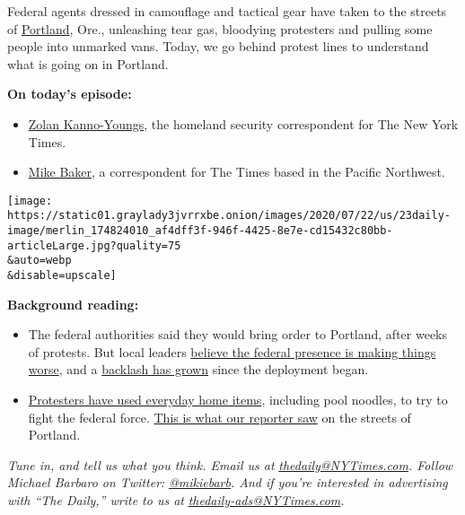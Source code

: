 Federal agents dressed in camouflage and tactical gear have taken to the
streets of
\href{https://www.nytimes3xbfgragh.onion/2020/07/23/upshot/trump-portland.html}{Portland},
Ore., unleashing tear gas, bloodying protesters and pulling some people
into unmarked vans. Today, we go behind protest lines to understand what
is going on in Portland.

\textbf{On today's episode:}

\begin{itemize}
\item
  \href{https://www.nytimes3xbfgragh.onion/by/zolan-kanno-youngs}{Zolan
  Kanno-Youngs}, the homeland security correspondent for The New York
  Times.
\item
  \href{https://www.nytimes3xbfgragh.onion/by/mike-baker?smid=pc-thedaily}{Mike
  Baker}, a correspondent for The Times based in the Pacific Northwest.
\end{itemize}

\texttt{[image: https://static01.graylady3jvrrxbe.onion/images/2020/07/22/us/23daily-image/merlin\_174824010\_af4dff3f-946f-4425-8e7e-cd15432c80bb-articleLarge.jpg?quality=75\\\&auto=webp\\\&disable=upscale]}

\textbf{Background reading:}

\begin{itemize}
\item
  The federal authorities said they would bring order to Portland, after
  weeks of protests. But local leaders
  \href{https://www.nytimes3xbfgragh.onion/2020/07/17/us/portland-protests.html}{believe
  the federal presence is making things worse}, and a
  \href{https://www.nytimes3xbfgragh.onion/2020/07/21/us/portland-protests.html}{backlash
  has grown} since the deployment began.
\item
  \href{https://www.nytimes3xbfgragh.onion/2020/07/22/us/portland-protest-tactics.html}{Protesters
  have used everyday home items}, including pool noodles, to try to
  fight the federal force.
  \href{https://www.nytimes3xbfgragh.onion/interactive/2020/07/21/us/portland-protests.html}{This
  is what our reporter saw} on the streets of Portland.
\end{itemize}

\emph{Tune in, and tell us what you think. Email us at}
\href{mailto:thedaily@NYTimes.com}{\emph{thedaily@NYTimes.com}}\emph{.
Follow Michael Barbaro on Twitter:}
\href{https://twitter.com/mikiebarb}{\emph{@mikiebarb}}\emph{. And if
you're interested in advertising with ``The Daily,'' write to us at}
\href{mailto:thedaily-ads@NYTimes.com}{\emph{thedaily-ads@NYTimes.com}}\emph{.}

